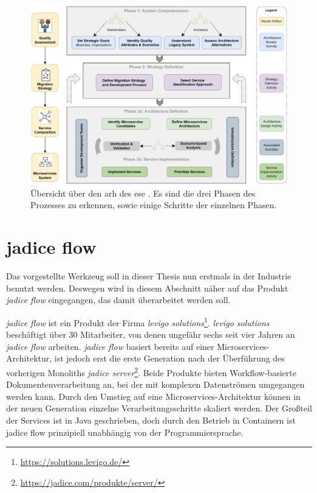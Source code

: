 \begin{figure}
	\centering
	\includegraphics[width=\textwidth]{figures/mmf-overview}
	\caption[Architecture Refactoring Helper Übersicht]{
		Übersicht über den \acrlong{arh} des \gls{ese} \cite{fritzsch2022architecturecentric}. Es sind die drei Phasen des Prozesses zu erkennen, sowie einige Schritte der einzelnen Phasen.
	}
	\label{fig:arh-overview}
\end{figure}

\section{jadice flow}

Das vorgestellte Werkzeug soll in dieser Thesis nun erstmals in der Industrie benutzt werden.
Deswegen wird in diesem Abschnitt näher auf das Produkt \emph{jadice flow} eingegangen, das damit überarbeitet werden soll.

\emph{jadice flow} ist ein Produkt der Firma \emph{levigo solutions}\footnote{\url{https://solutions.levigo.de/}}.
\emph{levigo solutions} beschäftigt über 30 Mitarbeiter, von denen ungefähr sechs seit vier Jahren an \emph{jadice flow} arbeiten.
\emph{jadice flow} basiert bereits auf einer Microservices-Architektur, ist jedoch erst die erste Generation nach der Überführung des vorherigen Monoliths \emph{jadice server}\footnote{\url{https://jadice.com/produkte/server/}}.
Beide Produkte bieten Workflow-basierte Dokumentenverarbeitung an, bei der mit komplexen Datenströmen umgegangen werden kann.
Durch den Umstieg auf eine Microservices-Architektur können in der neuen Generation einzelne Verarbeitungsschritte skaliert werden.
Der Großteil der Services ist in Java geschrieben, doch durch den Betrieb in Containern ist jadice flow prinzipiell unabhängig von der Programmiersprache.

